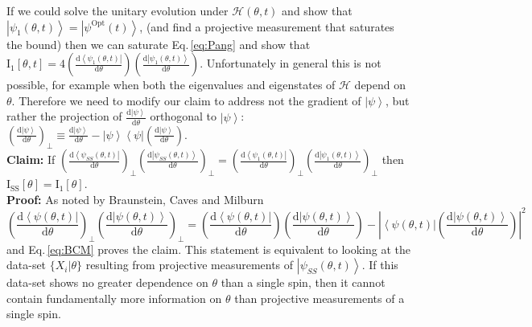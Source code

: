 \documentclass[reqno]{amsart}
\newcommand{\ket}[1]{\left| #1 \right>}
\newcommand{\bra}[1]{\left< #1 \right|}
\newcommand{\hham}{\mathcal{H}}
\def\funcwrt#1#2#3{\mathrm{#1}_{\mathrm{#3}}\left[#2\right]}
\begin{document}
If we could solve the unitary evolution under $\hham(\theta, t)$ and show that $\ket{\psi_1(\theta,t)} = \ket{\psi^{\mathrm{Opt}}(t)}$, (and find a projective measurement that saturates the bound) then we can saturate Eq.\,\eqref{eq:Pang} and show that $\funcwrt{I}{\theta,t}{1} = 4\left(\frac{\mathrm{d}\bra{\psi_1(\theta,t)}}{\mathrm{d} \theta}\right)\left(\frac{\mathrm{d}\ket{\psi_1(\theta,t)}}{\mathrm{d} \theta}\right)$. Unfortunately in general this is not possible, for example when both the eigenvalues and eigenstates of $\hham$ depend on $\theta$. Therefore we need to modify our claim to address not the gradient of $\ket{\psi}$, but rather the projection of $\frac{\mathrm{d}\ket{\psi}}{\mathrm{d} \theta}$ orthogonal to $\ket{\psi}$: $\left(\frac{\mathrm{d}\ket{\psi}}{\mathrm{d} \theta}\right)_{\perp} \equiv \frac{\mathrm{d}\ket{\psi}}{\mathrm{d}\theta}-\ket{\psi}\bra{\psi}\left(\frac{\mathrm{d}\ket{\psi}}{\mathrm{d}\theta}\right)$.\\

\textbf{Claim:} If $\left(\frac{\mathrm{d}\bra{\psi_{SS}(\theta,t)}}{\mathrm{d} \theta}\right)_{\perp}\left(\frac{\mathrm{d}\ket{\psi_{SS}(\theta,t)}}{\mathrm{d} \theta}\right)_{\perp} = \left(\frac{\mathrm{d}\bra{\psi_1(\theta,t)}}{\mathrm{d} \theta}\right)_{\perp}\left(\frac{\mathrm{d}\ket{\psi_1(\theta,t)}}{\mathrm{d} \theta}\right)_{\perp}$ then $\funcwrt{I}{\theta}{SS} = \funcwrt{I}{\theta}{1}$.\\

\textbf{Proof:} As noted by Braunstein, Caves and Milburn \cite{Braunstein1996}
\[ \left(\frac{\mathrm{d}\bra{\psi(\theta,t)}}{\mathrm{d} \theta}\right)_{\perp}\left(\frac{\mathrm{d}\ket{\psi(\theta,t)}}{\mathrm{d} \theta}\right)_{\perp} = \left(\frac{\mathrm{d}\bra{\psi(\theta,t)}}{\mathrm{d} \theta}\right)\left(\frac{\mathrm{d}\ket{\psi(\theta,t)}}{\mathrm{d} \theta}\right) - \left|\bra{\psi(\theta,t)}\left(\frac{\mathrm{d}\ket{\psi(\theta,t)}}{\mathrm{d} \theta}\right)\right|^2 \]
and Eq.\,\eqref{eq:BCM} proves the claim. This statement is equivalent to looking at the data-set $\{X_i|\theta\}$ resulting from projective measurements of $\ket{\psi_{SS}(\theta,t)}$. If this data-set shows no greater dependence on $\theta$ than a single spin, then it cannot contain fundamentally more information on $\theta$ than projective measurements of a single spin.\\
\end{document}
